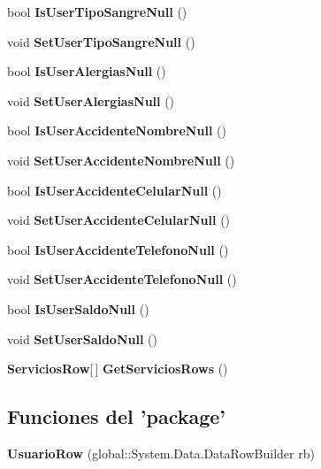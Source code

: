 \begin{DoxyCompactItemize}
bool {\bf Is\-User\-Tipo\-Sangre\-Null} ()
\item 
void {\bf Set\-User\-Tipo\-Sangre\-Null} ()
\item 
bool {\bf Is\-User\-Alergias\-Null} ()
\item 
void {\bf Set\-User\-Alergias\-Null} ()
\item 
bool {\bf Is\-User\-Accidente\-Nombre\-Null} ()
\item 
void {\bf Set\-User\-Accidente\-Nombre\-Null} ()
\item 
bool {\bf Is\-User\-Accidente\-Celular\-Null} ()
\item 
void {\bf Set\-User\-Accidente\-Celular\-Null} ()
\item 
bool {\bf Is\-User\-Accidente\-Telefono\-Null} ()
\item 
void {\bf Set\-User\-Accidente\-Telefono\-Null} ()
\item 
bool {\bf Is\-User\-Saldo\-Null} ()
\item 
void {\bf Set\-User\-Saldo\-Null} ()
\item 
{\bf Servicios\-Row}[$\,$] {\bf Get\-Servicios\-Rows} ()
\end{DoxyCompactItemize}
\subsection*{Funciones del 'package'}
\begin{DoxyCompactItemize}
\item 
{\bf Usuario\-Row} (global\-::\-System.\-Data.\-Data\-Row\-Builder rb)
\end{DoxyCompactItemize}
